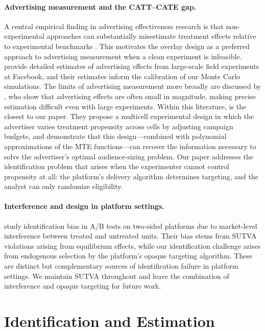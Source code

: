 \documentclass[11pt]{article}
\begin{document}
\paragraph{Advertising measurement and the CATT--CATE gap.}
A central empirical finding in advertising effectiveness research is that
non-experimental approaches can substantially misestimate treatment effects
relative to experimental benchmarks \citep{gordon2023close}.  This motivates
the overlay design as a preferred approach to advertising measurement when a
clean experiment is infeasible.  \citet{gordon2019comparison} provide detailed
estimates of advertising effects from large-scale field experiments at Facebook,
and their estimates inform the calibration of our Monte Carlo simulations.  The
limits of advertising measurement more broadly are discussed by
\citet{lewis2015unfavorable}, who show that advertising effects are often small
in magnitude, making precise estimation difficult even with large experiments.
Within this literature, \citet{waisman2025multicell} is the closest to our
paper.  They propose a multicell experimental design in which the advertiser
varies treatment propensity across cells by adjusting campaign budgets, and
demonstrate that this design---combined with polynomial approximations of the
MTE functions---can recover the information necessary to solve the advertiser's
optimal audience-sizing problem.  Our paper addresses the identification problem
that arises when the experimenter cannot control propensity at all: the
platform's delivery algorithm determines targeting, and the analyst can only
randomize eligibility.

\paragraph{Interference and design in platform settings.}
\citet{johari2022experimental} study identification bias in A/B tests on
two-sided platforms due to market-level interference between treated and
untreated units.  Their bias stems from SUTVA violations arising from
equilibrium effects, while our identification challenge arises from endogenous
selection by the platform's opaque targeting algorithm.  These are distinct but
complementary sources of identification failure in platform settings.  We
maintain SUTVA throughout and leave the combination of interference and opaque
targeting for future work.

\section{Identification and Estimation}
\label{sec:theory}
\end{document}
